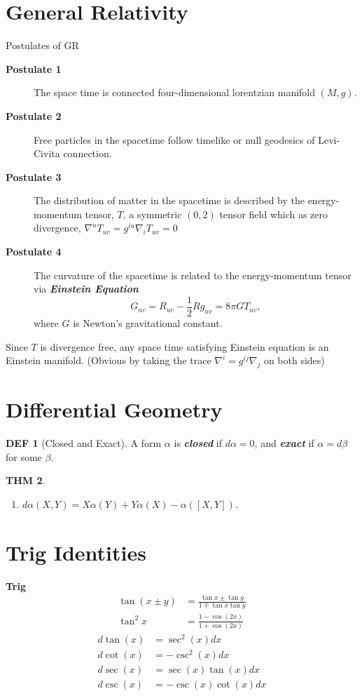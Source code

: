 \documentclass[twocolumn]{article}
\renewcommand{\emph}[1]{\textbf{\textit{#1}}}
\newcommand{\n}{\nabla}
\newtheorem{thm}{THM}
\theoremstyle{definition}
\newtheorem{defi}[thm]{DEF}
\begin{document}
\section{General Relativity}
\begin{fthm}{Postulates of GR}{}
	\begin{description}
		\item[\textbf{Postulate 1}] The space time is connected four-dimensional lorentzian manifold $(M, g)$.
		\item[\textbf{Postulate 2}] Free particles in the spacetime follow timelike or null geodesics of Levi-Civita connection.
		\item[\textbf{Postulate 3}] The distribution of matter in the spacetime is described by the energy-momentum tensor, $T$, a symmetric $(0,2)$ tensor field which as zero divergence, $\n^u T_{uv} = g^{iu} \n_i T_{uv}= 0$
		\item[\textbf{Postulate 4}] The curvature of the spacetime is related to the energy-momentum tensor via \emph{Einstein Equation}
			$$
			G_{uv} = R_{uv} - \frac{1}{2}R g_{uv} = 8\pi G T_{uv},
			$$
		where $G$ is Newton's gravitational constant.
	\end{description}
	Since $T$ is divergence free, any space time satisfying Einstein equation is an Einstein manifold. 
	(Obvious by taking the trace $\n^i = g^{ij} \n_j$ on both sides)
\end{fthm}

\section{Differential Geometry}

\begin{defi}[Closed and Exact]
	A form $\alpha$ is \emph{closed} if $d \alpha = 0$, and \emph{exact} if $\alpha = d \beta$ for some $\beta$.
\end{defi}
\begin{thm}
	\begin{enumerate}
		\item $d \alpha(X, Y) = X \alpha (Y) + Y \alpha(X) - \alpha([X, Y])$.
	\end{enumerate}
\end{thm}

\section{Trig Identities}

\textbf{Trig}
\begin{align*}
\tan(x \pm y) &= \frac{\tan x \pm \tan y}{1 \mp \tan x \tan y}\\
\tan^2 x &= \frac{1 - \cos(2x)}{1 + \cos(2x)}
\end{align*}
\begin{align*}
	d \tan(x) &= \sec^2(x) dx\\
	d \cot(x) &= - \csc^2(x) dx\\
	d \sec(x) &= \sec(x)\tan(x) dx\\
	d \csc(x) &= - \csc(x)\cot(x) dx\\
\end{align*}
\end{document}
